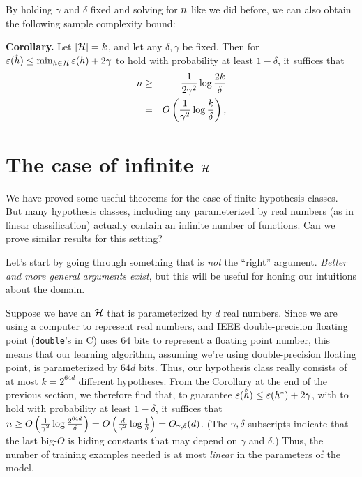 \documentclass{article} %
\renewcommand{\di}{d}
\begin{document}
By holding $\gamma$ and $\delta$ fixed and solving for ${n}$ like we
did before, we can also obtain the following sample complexity bound:

\medskip
\noindent
{\bf Corollary.} Let $|{\cal H}|=k$, and let any $\delta, \gamma$ be fixed.  Then for
$\varepsilon(\hat{h}) \leq \min_{h \in {\cal H}} \varepsilon(h) + 2 \gamma$ to hold with probability at least $1-\delta$,
it suffices that
\begin{eqnarray*}
{n} &\geq& \frac{1}{2\gamma^2}\log\frac{2k}{\delta}\\
  &=& O\left(\frac{1}{\gamma^2}\log\frac{k}{\delta}\right),
\end{eqnarray*}


\section{The case of infinite ${\cal H}$}

We have proved some useful theorems for the case of finite hypothesis
classes. But many hypothesis classes, including any parameterized by real numbers
(as in linear classification) actually contain an infinite number of functions.
Can we prove similar results for this setting?

Let's start by going through something that is \emph{not} the ``right'' argument.
\emph{Better and more general arguments exist}, but this will be useful for
honing our intuitions about the domain.

Suppose we have an ${\cal H}$ that is parameterized by $\di$ real numbers.  Since we are using a computer to
represent real numbers, and IEEE double-precision floating point ({\tt double}'s in C)
uses 64 bits
to represent a floating point number, this means that our learning algorithm, assuming we're using
double-precision floating point,  is parameterized by $64\di$ bits.  Thus, our hypothesis class
really consists of at most $k=2^{64\di}$ different hypotheses.  From the Corollary at the end of the
previous section, we therefore find that, to guarantee
$\varepsilon(\hat{h}) \leq \varepsilon(h^\ast) + 2 \gamma$, with to hold with probability at least $1-\delta$,
it suffices that
$\nexp \geq O\left(\frac{1}{\gamma^2}\log\frac{2^{64\di}}{\delta}\right)
= O\left(\frac{\di}{\gamma^2}\log\frac{1}{\delta}\right)
= O_{\gamma,\delta}(\di)$.  (The $\gamma,\delta$ subscripts indicate that the last big-$O$ is hiding constants that may
depend on $\gamma$ and $\delta$.)  Thus, the number of training examples needed is at most \emph{linear}
in the parameters of the model.
\end{document}
